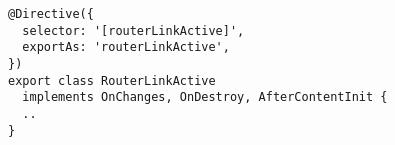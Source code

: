 \begin{verbatim}
@Directive({
  selector: '[routerLinkActive]',
  exportAs: 'routerLinkActive',
})
export class RouterLinkActive
  implements OnChanges, OnDestroy, AfterContentInit {
  ..
}
\end{verbatim}
